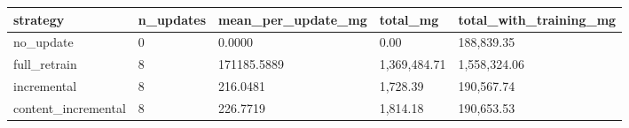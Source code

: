 \begin{tabular}{lllll}
\toprule
strategy & n_updates & mean_per_update_mg & total_mg & total_with_training_mg \\
\midrule
no_update & 0 & 0.0000 & 0.00 & 188,839.35 \\
full_retrain & 8 & 171185.5889 & 1,369,484.71 & 1,558,324.06 \\
incremental & 8 & 216.0481 & 1,728.39 & 190,567.74 \\
content_incremental & 8 & 226.7719 & 1,814.18 & 190,653.53 \\
\bottomrule
\end{tabular}
